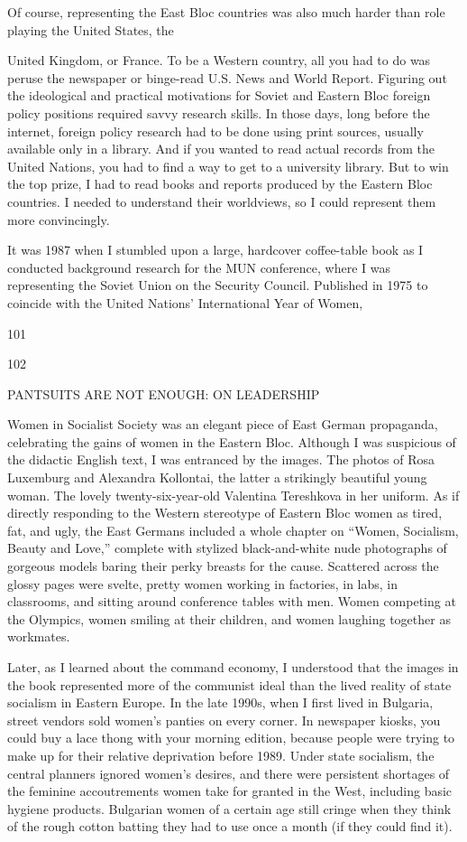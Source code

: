  \par 
Of course, representing the East Bloc countries was also much harder than role playing the United States, the
 \par 
United Kingdom, or France. To be a Western country, all you had to do was peruse the newspaper or binge-read U.S. News and World Report. Figuring out the ideological and practical motivations for Soviet and Eastern Bloc foreign policy positions required savvy research skills. In those days, long before the internet, foreign policy research had to be done using print sources, usually available only in a library. And if you wanted to read actual records from the United Nations, you had to find a way to get to a university library. But to win the top prize, I had to read books and reports produced by the Eastern Bloc countries. I needed to understand their worldviews, so I could represent them more convincingly.
 \par 
It was 1987 when I stumbled upon a large, hardcover coffee-table book as I conducted background research for the MUN conference, where I was representing the Soviet Union on the Security Council. Published in 1975 to coincide with the United Nations’ International Year of Women,
 \par 
101
 \par 
102
 \par 
PANTSUITS ARE NOT ENOUGH: ON LEADERSHIP
 \par 
Women in Socialist Society was an elegant piece of East German propaganda, celebrating the gains of women in the Eastern Bloc. Although I was suspicious of the didactic English text, I was entranced by the images. The photos of Rosa Luxemburg and Alexandra Kollontai, the latter a strikingly beautiful young woman. The lovely twenty-six-year-old Valentina Tereshkova in her uniform. As if directly responding to the Western stereotype of Eastern Bloc women as tired, fat, and ugly, the East Germans included a whole chapter on “Women, Socialism, Beauty and Love,” complete with stylized black-and-white nude photographs of gorgeous models baring their perky breasts for the cause. Scattered across the glossy pages were svelte, pretty women working in factories, in labs, in classrooms, and sitting around conference tables with men. Women competing at the Olympics, women smiling at their children, and women laughing together as workmates.
 \par 
Later, as I learned about the command economy, I understood that the images in the book represented more of the communist ideal than the lived reality of state socialism in Eastern Europe. In the late 1990s, when I first lived in Bulgaria, street vendors sold women’s panties on every corner. In newspaper kiosks, you could buy a lace thong with your morning edition, because people were trying to make up for their relative deprivation before 1989. Under state socialism, the central planners ignored women’s desires, and there were persistent shortages of the feminine accoutrements women take for granted in the West, including basic hygiene products. Bulgarian women of a certain age still cringe when they think of the rough cotton batting they had to use once a month (if they could find it).
